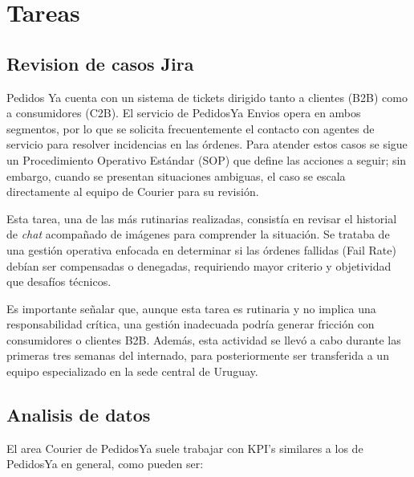 \section{Tareas}
\subsection{Revision de casos Jira}
Pedidos Ya cuenta con un sistema de tickets dirigido tanto a clientes (B2B) como a consumidores (C2B). El servicio de PedidosYa Envios opera en ambos segmentos, por lo que se solicita frecuentemente el contacto con agentes de servicio para resolver incidencias en las órdenes. Para atender estos casos se sigue un Procedimiento Operativo Estándar (SOP) que define las acciones a seguir; sin embargo, cuando se presentan situaciones ambiguas, el caso se escala directamente al equipo de Courier para su revisión.

Esta tarea, una de las más rutinarias realizadas, consistía en revisar el historial de \textit{chat} acompañado de imágenes para comprender la situación. Se trataba de una gestión operativa enfocada en determinar si las órdenes fallidas (Fail Rate) debían ser compensadas o denegadas, requiriendo mayor criterio y objetividad que desafíos técnicos.

Es importante señalar que, aunque esta tarea es rutinaria y no implica una responsabilidad crítica, una gestión inadecuada podría generar fricción con consumidores o clientes B2B. Además, esta actividad se llevó a cabo durante las primeras tres semanas del internado, para posteriormente ser transferida a un equipo especializado en la sede central de Uruguay.

\subsection{Analisis de datos}

El area Courier de PedidosYa suele trabajar con KPI's similares a los de PedidosYa en general, como pueden ser:

